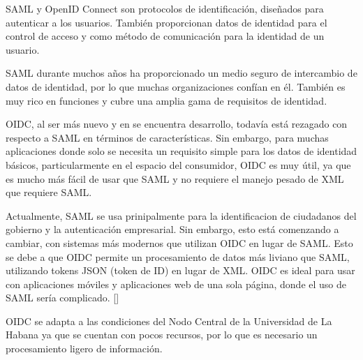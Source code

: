 SAML y OpenID Connect son protocolos de identificación, diseñados para autenticar a los usuarios. También proporcionan datos de identidad para el control de acceso y como método de comunicación para la identidad de un usuario.

SAML durante muchos años ha proporcionado un medio seguro de intercambio de datos de identidad, por lo que muchas organizaciones confían en él. También es muy rico en funciones y cubre una amplia gama de requisitos de identidad.


OIDC, al ser más nuevo y en se encuentra desarrollo, todavía está rezagado con respecto a SAML en términos de características. Sin embargo, para muchas aplicaciones donde solo se necesita un requisito simple para los datos de identidad básicos, particularmente en el espacio del consumidor, OIDC es muy útil, ya que es mucho más fácil de usar que SAML y no requiere el manejo pesado de XML que requiere SAML.

Actualmente, SAML se usa prinipalmente para la identificacion de ciudadanos del gobierno y la autenticación empresarial. Sin embargo, esto está comenzando a cambiar, con sistemas más modernos que utilizan OIDC en lugar de SAML. Esto se debe a que OIDC permite un procesamiento de datos más liviano que SAML, utilizando tokens JSON (token de ID) en lugar de XML. OIDC es ideal para usar con aplicaciones móviles y aplicaciones web de una sola página, donde el uso de SAML sería complicado. [\cite{naik2017securing}]

OIDC se adapta a las condiciones del Nodo Central de la Universidad de La Habana ya que se cuentan con pocos recursos, por lo que es necesario un procesamiento ligero de información. 

